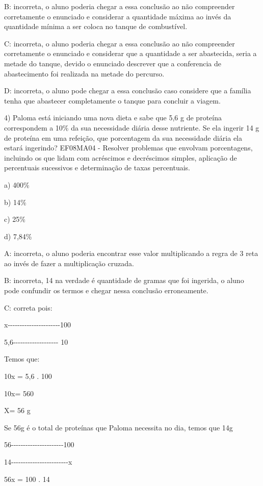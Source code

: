 B: incorreta, o aluno poderia chegar a essa conclusão ao não compreender
corretamente o enunciado e considerar a quantidade máxima ao invés da
quantidade mínima a ser coloca no tanque de combustível.

C: incorreta, o aluno poderia chegar a essa conclusão ao não compreender
corretamente o enunciado e considerar que a quantidade a ser abastecida,
seria a metade do tanque, devido o enunciado descrever que a conferencia
de abastecimento foi realizada na metade do percurso.

D: incorreta, o aluno pode chegar a essa conclusão caso considere que a
família tenha que abastecer completamente o tanque para concluir a
viagem.

4) Paloma está iniciando uma nova dieta e sabe que 5,6 g de proteína
correspondem a 10\% da sua necessidade diária desse nutriente. Se ela
ingerir 14 g de proteína em uma refeição, que porcentagem da sua
necessidade diária ela estará ingerindo? EF08MA04 - Resolver problemas
que envolvam porcentagens, incluindo os que lidam com acréscimos e
decréscimos simples, aplicação de percentuais sucessivos e determinação
de taxas percentuais.

a) 400\%

b) 14\%

c) 25\%

d) 7,84\%

A: incorreta, o aluno poderia encontrar esse valor multiplicando a regra
de 3 reta ao invés de fazer a multiplicação cruzada.

B: incorreta, 14 na verdade é quantidade de gramas que foi ingerida, o
aluno pode confundir os termos e chegar nessa conclusão erroneamente.

C: correta pois:

x-\/-\/-\/-\/-\/-\/-\/-\/-\/-\/-\/-\/-\/-\/-\/-\/-\/-\/-\/-\/-\/-100

5,6-\/-\/-\/-\/-\/-\/-\/-\/-\/-\/-\/-\/-\/-\/-\/-\/-\/-\/- 10

Temos que:

10x = 5,6 . 100

10x= 560

X= 56 g

Se 56g é o total de proteínas que Paloma necessita no dia, temos que 14g

56-\/-\/-\/-\/-\/-\/-\/-\/-\/-\/-\/-\/-\/-\/-\/-\/-\/-\/-\/-\/-\/-100

14-\/-\/-\/-\/-\/-\/-\/-\/-\/-\/-\/-\/-\/-\/-\/-\/-\/-\/-\/-\/-\/-\/-\/-x

56x = 100 . 14

